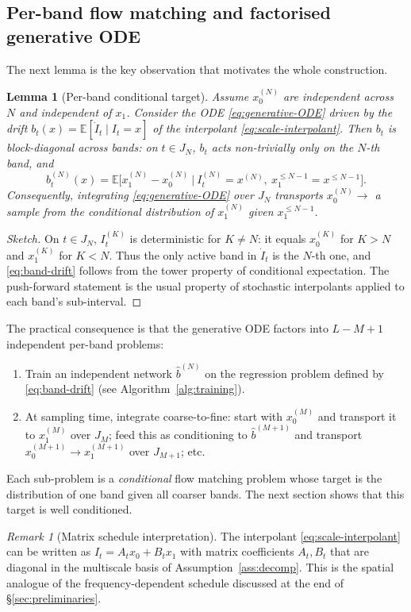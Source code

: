 \documentclass[11pt]{amsart}
\newcommand{\bE}{\mathbb{E}} \newcommand{\bP}{\mathbb{P}}
\newtheorem{lemma}[theorem]{Lemma}
\theoremstyle{remark}
\newtheorem{remark}[theorem]{Remark}
\numberwithin{equation}{section}
\begin{document}
\subsection{Per-band flow matching and factorised generative ODE}
The next lemma is the key observation that motivates the whole construction.
\begin{lemma}[Per-band conditional target]
\label{lem:cond-target}
Assume $x_0^{(N)}$ are independent across $N$ and independent of $x_1$. Consider the ODE \eqref{eq:generative-ODE} driven by the drift $b_t(x)=\bE[\dot I_t\mid I_t=x]$ of the interpolant \eqref{eq:scale-interpolant}. Then $b_t$ is block-diagonal across bands: on $t\in J_N$, $b_t$ acts non-trivially only on the $N$-th band, and
\begin{equation}
\label{eq:band-drift}
 b_t^{(N)}(x) = \bE\big[x_1^{(N)}-x_0^{(N)}\ \big|\ I_t^{(N)}=x^{(N)},\ x_1^{\le N-1}=x^{\le N-1}\big].
\end{equation}
Consequently, integrating \eqref{eq:generative-ODE} over $J_N$ transports $x_0^{(N)}\to $ a sample from the conditional distribution of $x_1^{(N)}$ given $x_1^{\le N-1}$.
\end{lemma}
\begin{proof}[Sketch]
On $t\in J_N$, $I_t^{(K)}$ is deterministic for $K\ne N$: it equals $x_0^{(K)}$ for $K>N$ and $x_1^{(K)}$ for $K<N$. Thus the only active band in $\dot I_t$ is the $N$-th one, and \eqref{eq:band-drift} follows from the tower property of conditional expectation. The push-forward statement is the usual property of stochastic interpolants applied to each band's sub-interval.
\end{proof}
The practical consequence is that the generative ODE factors into $L-M+1$ independent per-band problems:
\begin{enumerate}
\item Train an independent network $\hat b^{(N)}$ on the regression problem defined by \eqref{eq:band-drift} (see Algorithm~\ref{alg:training}).
\item At sampling time, integrate coarse-to-fine: start with $x_0^{(M)}$ and transport it to $x_1^{(M)}$ over $J_M$; feed this as conditioning to $\hat b^{(M+1)}$ and transport $x_0^{(M+1)}\to x_1^{(M+1)}$ over $J_{M+1}$; etc.
\end{enumerate}
Each sub-problem is a \emph{conditional} flow matching problem whose target is the distribution of one band given all coarser bands. The next section shows that this target is well conditioned.

\begin{remark}[Matrix schedule interpretation]
The interpolant \eqref{eq:scale-interpolant} can be written as $I_t = A_t x_0 + B_t x_1$ with matrix coefficients $A_t,B_t$ that are diagonal in the multiscale basis of Assumption~\ref{ass:decomp}. This is the spatial analogue of the frequency-dependent schedule discussed at the end of \S\ref{sec:preliminaries}.
\end{remark}
\end{document}
